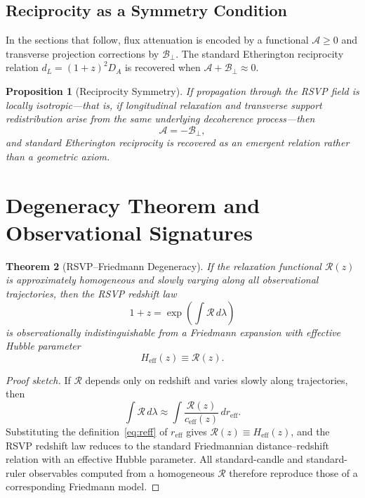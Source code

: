 \documentclass[12pt,a4paper]{article}
\newtheorem{theorem}{Theorem}[section]
\newtheorem{proposition}[theorem]{Proposition}
\theoremstyle{remark}
\newcommand{\Rcal}{\mathcal{R}}
\newcommand{\Acal}{\mathcal{A}}
\newcommand{\Bcal}{\mathcal{B}}
\newcommand{\reff}{r_{\mathrm{eff}}}
\newcommand{\Heff}{H_{\mathrm{eff}}}
\newcommand{\ceff}{c_{\mathrm{eff}}}
\begin{document}
\subsection{Reciprocity as a Symmetry Condition}

In the sections that follow, flux attenuation is encoded by a functional $\Acal \ge 0$ and transverse projection corrections by $\Bcal_\perp$. The standard Etherington reciprocity relation $d_L = (1+z)^2 D_A$ is recovered when $\Acal + \Bcal_\perp \approx 0$.

\begin{proposition}[Reciprocity Symmetry]
If propagation through the RSVP field is locally isotropic---that is, if longitudinal relaxation and transverse support redistribution arise from the same underlying decoherence process---then
\begin{equation}
\Acal = -\Bcal_\perp,
\label{eq:reciprocity}
\end{equation}
and standard Etherington reciprocity is recovered as an emergent relation rather than a geometric axiom.
\end{proposition}

\section{Degeneracy Theorem and Observational Signatures}
\label{sec:degeneracy}

\begin{theorem}[RSVP--Friedmann Degeneracy]
\label{thm:degeneracy}
If the relaxation functional $\Rcal(z)$ is approximately homogeneous and slowly varying along all observational trajectories, then the RSVP redshift law
\begin{equation}
1 + z = \exp\!\left(\int \Rcal\, d\lambda\right)
\end{equation}
is observationally indistinguishable from a Friedmann expansion with effective Hubble parameter
\begin{equation}
\Heff(z) \equiv \Rcal(z).
\end{equation}
\end{theorem}

\begin{proof}[Proof sketch]
If $\Rcal$ depends only on redshift and varies slowly along trajectories, then
\begin{equation}
\int \Rcal\, d\lambda \approx \int \frac{\Rcal(z)}{\ceff(z)}\, dr_{\mathrm{eff}}.
\end{equation}
Substituting the definition~\eqref{eq:reff} of $\reff$ gives $\Rcal(z) \equiv \Heff(z)$, and the RSVP redshift law reduces to the standard Friedmannian distance--redshift relation with an effective Hubble parameter. All standard-candle and standard-ruler observables computed from a homogeneous $\Rcal$ therefore reproduce those of a corresponding Friedmann model.
\end{proof}
\end{document}
